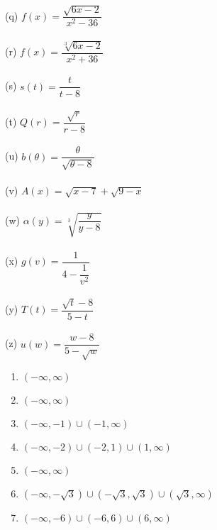 \begin{enumialphparenastyle}
\begin{multicols}{2}
\begin{ex}
\\
(q) \hspace{2mm}  $f(x) = \dfrac{\sqrt{6x-2}}{x^2-36}$\\
\\
(r) \hspace{2mm} $f(x) = \dfrac{\sqrt[3]{6x-2}}{x^2+36}$\\
\\
(s) \hspace{2mm}  $s(t) = \dfrac{t}{t - 8}$\\
\\
(t) \hspace{2mm} $Q(r) = \dfrac{\sqrt{r}}{r - 8}$\\
\\
(u) \hspace{2mm}  $b(\theta) = \dfrac{\theta}{\sqrt{\theta - 8}}$\\
\\
(v) \hspace{2mm} $A(x) = \sqrt{x - 7} + \sqrt{9 - x}$\\
\\
(w) \hspace{2mm} $\alpha(y) = \sqrt[3]{\dfrac{y}{y - 8}}$\\
\\
(x) \hspace{2mm} $g(v) = \dfrac{1}{4 - \dfrac{1}{v^{2}}}$\\
\\
(y) \hspace{2mm}  $T(t) = \dfrac{\sqrt{t} - 8}{5-t}$ \\
\\
(z) \hspace{2mm} $u(w) = \dfrac{w - 8}{5 - \sqrt{w}}$ \\
\begin{sol}
\begin{multicols}{2}
	\begin{enumerate}
		\item $(-\infty, \infty)$
		\item  $(-\infty, \infty)$
		\item $(-\infty, -1) \cup (-1, \infty)$
		\item  $(-\infty,-2) \cup (-2,1) \cup (1, \infty)$
		\item $(-\infty, \infty)$
		\item  $(-\infty, -\sqrt{3}) \cup (-\sqrt{3}, \sqrt{3}) \cup (\sqrt{3}, \infty)$
		\item  $(-\infty, -6) \cup (-6,6) \cup (6, \infty)$

\end{enumerate}
\end{multicols}
\end{sol}
\end{ex}
\end{multicols}
\end{enumialphparenastyle}
